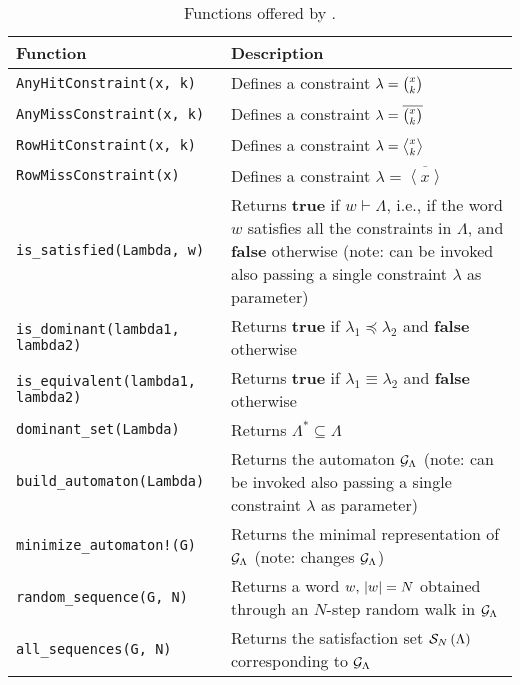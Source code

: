 \begin{table*}[t]
    \centering
    \caption{Functions offered by \tool{}.}
    \label{tab:tool:functionality}
    {\renewcommand{\arraystretch}{1.4}
    \begin{tabular}{p{}p{}}
        \hline\hline
        \textbf{Function} & \textbf{Description} \\ \hline \hline
        \texttt{AnyHitConstraint(x, k)}             & Defines a constraint $\lambda = \binom{x_{}}{k_{}}$ \\ \hline
        \texttt{AnyMissConstraint(x, k)}            & Defines a constraint $\lambda = \overline{\binom{x_{}}{k_{}}}$  \\ \hline
        \texttt{RowHitConstraint(x, k)}             & Defines a constraint $\lambda = \rowhit{}$  \\ \hline
        \texttt{RowMissConstraint(x)}               & Defines a constraint $\lambda = \overline{\left<x\right>}$  \\ \hline
        \texttt{is\_satisfied(Lambda, w)}           & Returns \textbf{true} if $w \vdash \Lambda$, i.e., if the word $w$ satisfies all the constraints in $\Lambda$, and \textbf{false} otherwise (note: can be invoked also passing a single constraint $\lambda$ as parameter) \\ \hline
        \texttt{is\_dominant(lambda1, lambda2)}     & Returns \textbf{true} if $\lambda_1 \preceq \lambda_2$ and \textbf{false} otherwise \\ \hline
        \texttt{is\_equivalent(lambda1, lambda2)}   & Returns \textbf{true} if $\lambda_1 \equiv \lambda_2$ and \textbf{false} otherwise \\ \hline
        \texttt{dominant\_set(Lambda)}              & Returns $\Lambda^* \subseteq \Lambda$ \\ \hline
        \texttt{build\_automaton(Lambda)}           & Returns the automaton $\mathcal{G}_{\Lambda}$ (note: can be invoked also passing a single constraint $\lambda$ as parameter) \\ \hline
        \texttt{minimize\_automaton!(G)}            & Returns the minimal representation of $\mathcal{G}_{\Lambda}$ (note: changes $\mathcal{G}_{\Lambda}$) \\ \hline
        \texttt{random\_sequence(G, N)}             & Returns a word $w,\, \left|w\right|=N$ obtained through an $N$-step random walk in $\mathcal{G}_{\Lambda}$ \\ \hline
        \texttt{all\_sequences(G, N)}               & Returns the satisfaction set $\mathcal{S}_{N}\left( \Lambda \right)$ corresponding to $\mathcal{G}_{\Lambda}$ \\ \hline\hline
    \end{tabular}
    }
\end{table*}
